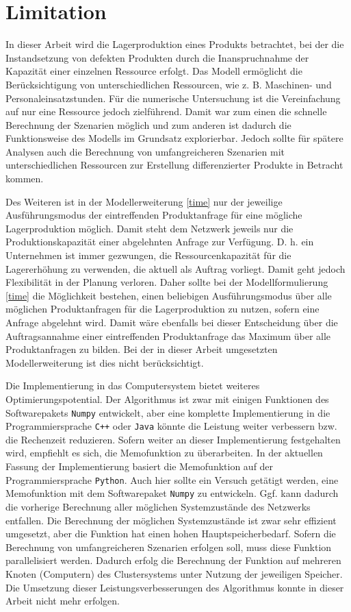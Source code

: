 \section*{Limitation}
In dieser Arbeit wird die Lagerproduktion eines Produkts betrachtet, bei der die Instandsetzung von defekten Produkten durch die Inanspruchnahme der Kapazität einer einzelnen Ressource erfolgt. Das Modell ermöglicht die Berücksichtigung von unterschiedlichen Ressourcen, wie z. B. Maschinen- und Personaleinsatzstunden. Für die numerische Untersuchung ist die Vereinfachung auf nur eine Ressource jedoch zielführend. Damit war zum einen die schnelle Berechnung der Szenarien möglich und zum anderen ist dadurch die Funktionsweise des Modells im Grundsatz explorierbar. Jedoch sollte für spätere Analysen auch die Berechnung von umfangreicheren Szenarien mit unterschiedlichen Ressourcen zur Erstellung differenzierter Produkte in Betracht kommen.

Des Weiteren ist in der Modellerweiterung \eqref{time} nur der jeweilige Ausführungsmodus der eintreffenden Produktanfrage für eine mögliche Lagerproduktion möglich. Damit steht dem Netzwerk jeweils nur die Produktionskapazität einer abgelehnten Anfrage zur Verfügung. D. h. ein Unternehmen ist immer gezwungen, die Ressourcenkapazität für die Lagererhöhung zu verwenden, die aktuell als Auftrag vorliegt. Damit geht jedoch Flexibilität in der Planung verloren. Daher sollte bei der Modellformulierung \eqref{time} die Möglichkeit bestehen, einen beliebigen Ausführungsmodus über alle möglichen Produktanfragen für die Lagerproduktion zu nutzen, sofern eine Anfrage abgelehnt wird. Damit wäre ebenfalls bei dieser Entscheidung über die Auftragsannahme einer eintreffenden Produktanfrage das Maximum über alle Produktanfragen zu bilden. Bei der in dieser Arbeit umgesetzten Modellerweiterung ist dies nicht berücksichtigt.

Die Implementierung in das Computersystem bietet weiteres Optimierungspotential. Der Algorithmus ist zwar mit einigen Funktionen des Softwarepakets \texttt{Numpy} entwickelt, aber eine komplette Implementierung in die Programmiersprache \texttt{C++} oder \texttt{Java} könnte die Leistung weiter verbessern bzw. die Rechenzeit reduzieren. Sofern weiter an dieser Implementierung festgehalten wird, empfiehlt es sich, die Memofunktion zu überarbeiten. In der aktuellen Fassung der Implementierung basiert die Memofunktion auf der Programmiersprache \texttt{Python}. Auch hier sollte ein Versuch getätigt werden, eine Memofunktion mit dem Softwarepaket \texttt{Numpy} zu entwickeln. Ggf. kann dadurch die vorherige Berechnung aller möglichen Systemzustände des Netzwerks entfallen. Die Berechnung der möglichen Systemzustände ist zwar sehr effizient umgesetzt, aber die Funktion hat einen hohen Hauptspeicherbedarf. Sofern die Berechnung von umfangreicheren Szenarien erfolgen soll, muss diese Funktion parallelisiert werden. Dadurch erfolg die Berechnung der Funktion auf mehreren Knoten (Computern) des Clustersystems unter Nutzung der jeweiligen Speicher. Die Umsetzung dieser Leistungsverbesserungen des Algorithmus konnte in dieser Arbeit nicht mehr erfolgen.

